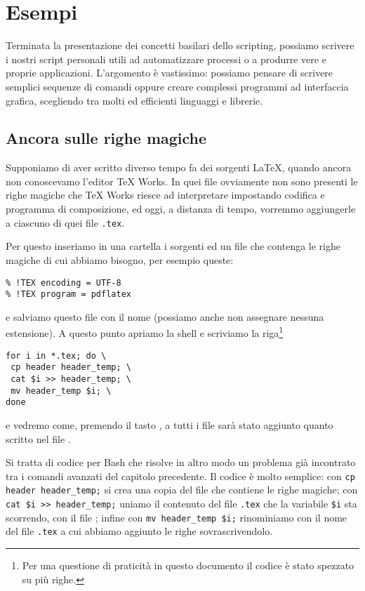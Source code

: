 \section{Esempi}

Terminata la presentazione dei concetti basilari dello scripting, possiamo
scrivere i nostri script personali utili ad automatizzare processi o a produrre
vere e proprie applicazioni. L'argomento è vastissimo: possiamo pensare di
scrivere semplici sequenze di comandi oppure creare complessi programmi ad
interfaccia grafica, scegliendo tra molti ed efficienti linguaggi e librerie.

\subsection{Ancora sulle righe magiche}
\label{sssec:addheader}

Supponiamo di aver scritto diverso tempo fa dei sorgenti \LaTeX, quando ancora
non conoscevamo l'editor TeX Works. In quei file ovviamente non sono presenti le
righe magiche che TeX Works riesce ad interpretare impostando codifica e
programma di composizione, ed oggi, a distanza di tempo, vorremmo aggiungerle a
ciascuno di quei file \texttt{.tex}.

Per questo inseriamo in una cartella i sorgenti ed un file che contenga le
righe magiche di cui abbiamo bisogno, per esempio queste:
\begin{Verbatim}
% !TEX encoding = UTF-8
% !TEX program = pdflatex
\end{Verbatim}
e salviamo questo file con il nome  (possiamo anche non
assegnare nessuna estensione). A questo punto apriamo la shell e scriviamo la
riga\footnote{Per una questione di praticità in questo documento il codice è
stato spezzato su più righe.}
\begin{Verbatim}
for i in *.tex; do \
 cp header header_temp; \
 cat $i >> header_temp; \
 mv header_temp $i; \
done
\end{Verbatim}
e vedremo come, premendo il tasto \keys{\return}, a tutti i file sarà stato
aggiunto quanto scritto nel file .

Si tratta di codice per Bash che risolve in altro modo un problema già
incontrato tra i comandi avanzati del capitolo precedente. Il codice è molto
semplice: con \verb!cp header header_temp;! si crea una copia del file che
contiene le righe magiche; con \verb!cat $i >> header_temp;! uniamo il
contenuto del file \texttt{.tex} che la variabile \verb!$i! sta
scorrendo, con il file \filestyle{header\_temp}; infine con
\verb!mv header_temp $i;! rinominiamo \filestyle{header\_temp} con il nome del
file \texttt{.tex} a cui abbiamo aggiunto le righe sovrascrivendolo.


